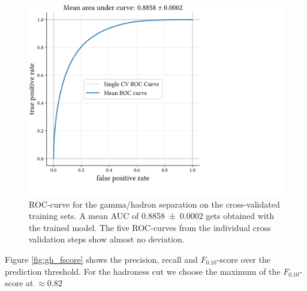 \begin{figure}
    \centering
    \captionsetup{width=0.9\linewidth}
    \hspace*{0.15\textwidth}\includegraphics[page=1, width=.9\textwidth]{../analysis/plots/cross_val_sep_perf_plot.pdf}
    \caption{ROC-curve for the gamma/hadron separation on the cross-validated training sets.
    A mean AUC of \num{0.8858 \pm 0.0002} gets obtained with the trained model.
    The five ROC-curves from the individual cross validation steps show almost no deviation.}
    \label{fig:gh_roc}
\end{figure}

Figure \ref{fig:gh_fscore} shows the precision, recall and $F_{\num{0.10}}$-score over
the prediction threshold.
For the hadroness cut we choose the maximum of the $F_{\num{0.10}}$-score
at $\approx \num{0.82}$

